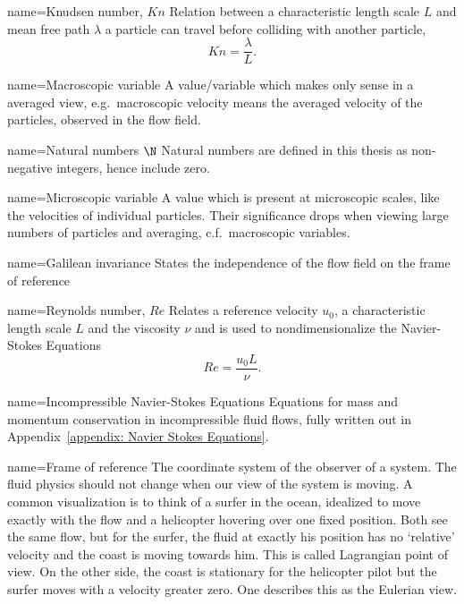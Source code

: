
{
name={Knudsen number, $Kn$}
}
{Relation between a characteristic length scale $L$ and mean free path $\lambda$ a particle can travel before colliding with another particle,
\begin{equation*}
  Kn=\frac{\lambda}{L}.
\end{equation*}}

{
name={Macroscopic variable}
}
{A value/variable which makes only sense in a averaged view, e.g.\ macroscopic velocity means the averaged velocity of the particles, observed in the flow field.
}

{
name={Natural numbers $\N$}
}
{Natural numbers are defined in this thesis as non-negative integers, hence include zero.
}

{
name={Microscopic variable}
}
{
A value which is present at microscopic scales, like the velocities of individual particles.
Their significance drops when viewing large numbers of particles and averaging, c.f.\ macroscopic variables.
}

{
name={Galilean invariance}
}{States the independence of the flow field on the frame of reference}

{
name={Reynolds number, $Re$}
}
{Relates a reference velocity $u_0$, a characteristic length scale $L$ and the viscosity $\nu$ and is used to nondimensionalize the Navier-Stokes Equations
\begin{equation*}
  \label{eq: definition of reynolds number}
  Re=\frac{u_0 L}{\nu}.
\end{equation*}}

{
name={Incompressible Navier-Stokes Equations}
}
{Equations for mass and momentum conservation in incompressible fluid flows, fully written out in Appendix~\ref{appendix: Navier Stokes Equations}.
}

{
name={Frame of reference}
}
{
The coordinate system of the observer of a system.
The fluid physics should not change when our view of the system is moving.
A common visualization is to think of a surfer in the ocean, idealized to move exactly with the flow and a helicopter hovering over one fixed position.
Both see the same flow, but for the surfer, the fluid at exactly his position has no `relative' velocity and the coast is moving towards him. This is called Lagrangian point of view.
On the other side, the coast is stationary for the helicopter pilot but the surfer moves with a velocity greater zero. One describes this as the Eulerian view.
}
